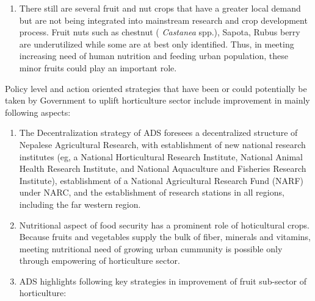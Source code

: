 \documentclass[
  openany]{book}
\begin{document}
\begin{enumerate}
\item
  There still are several fruit and nut crops that have a greater local demand but are not being integrated into mainstream research and crop development process. Fruit nuts such as chestnut ( \emph{Castanea} spp.), Sapota, Rubus berry are underutilized while some are at best only identified. Thus, in meeting increasing need of human nutrition and feeding urban population, these minor fruits could play an important role.
\end{enumerate}

Policy level and action oriented strategies that have been or could potentially be taken by Government to uplift horticulture sector include improvement in mainly following aspects:

\begin{enumerate}
\def\labelenumi{\arabic{enumi}.}
\item
  The Decentralization strategy of ADS foresees a decentralized structure of Nepalese Agricultural Research, with establishment of new national research institutes (eg, a National Horticultural Research Institute, National Animal Health Research Institute, and National Aquaculture and Fisheries Research Institute), establishment of a National Agricultural Research Fund (NARF) under NARC, and the establishment of research stations in all regions, including the far western region.
\item
  Nutritional aspect of food security has a prominent role of hoticultural crops. Because fruits and vegetables supply the bulk of fiber, minerals and vitamins, meeting nutritional need of growing urban cummunity is possible only through empowering of horticulture sector.
\item
  ADS highlights following key strategies in improvement of fruit sub-sector of horticulture:
\end{enumerate}
\end{document}
